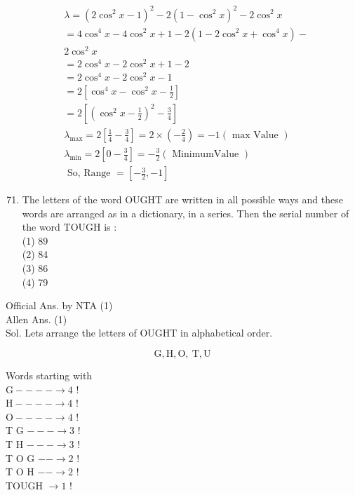 \documentclass[10pt]{article}
\begin{document}
\[
\begin{aligned}
& \lambda=\left(2 \cos ^{2} x-1\right)^{2}-2\left(1-\cos ^{2} x\right)^{2}-2 \cos ^{2} x \\
&=4 \cos ^{4} x-4 \cos ^{2} x+1-2\left(1-2 \cos ^{2} x+\cos ^{4} x\right)- \\
& 2 \cos ^{2} x \\
&=2 \cos ^{4} x-2 \cos ^{2} x+1-2 \\
&=2 \cos ^{4} x-2 \cos ^{2} x-1 \\
&=2\left[\cos ^{4} x-\cos ^{2} x-\frac{1}{2}\right] \\
&=2\left[\left(\cos ^{2} x-\frac{1}{2}\right)^{2}-\frac{3}{4}\right] \\
& \lambda_{\max }=2\left[\frac{1}{4}-\frac{3}{4}\right]=2 \times\left(-\frac{2}{4}\right)=-1(\text { max Value }) \\
& \lambda_{\min }=2\left[0-\frac{3}{4}\right]=-\frac{3}{2}(\text { MinimumValue }) \\
& \text { So, Range }=\left[-\frac{3}{2},-1\right]
\end{aligned}
\]

\begin{enumerate}
  \setcounter{enumi}{70}
  \item The letters of the word OUGHT are written in all possible ways and these words are arranged as in a dictionary, in a series. Then the serial number of the word TOUGH is :\\
(1) 89\\
(2) 84\\
(3) 86\\
(4) 79
\end{enumerate}

Official Ans. by NTA (1)\\
Allen Ans. (1)\\
Sol. Lets arrange the letters of OUGHT in alphabetical order.

\[
\mathrm{G}, \mathrm{H}, \mathrm{O}, \mathrm{~T}, \mathrm{U}
\]

Words starting with\\
\(\mathrm{G}----\rightarrow 4\) !\\
\(\mathrm{H}----\rightarrow 4\) !\\
\(\mathrm{O}----\rightarrow 4\) !\\
T G \(---\rightarrow 3\) !\\
T H \(---\rightarrow 3\) !\\
T O G \(--\rightarrow 2\) !\\
T O H \(--\rightarrow 2\) !\\
TOUGH \(\rightarrow 1\) !
\end{document}
